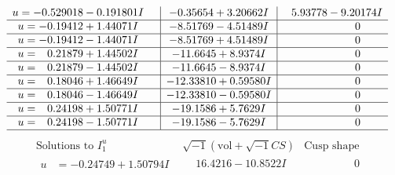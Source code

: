 \documentclass[1p]{elsarticle_modified}
\theoremstyle{definition}
\newcommand{\I}{\sqrt{-1}}
\begin{document}
$$\begin{array}{c|c|c}
\begin{aligned}
u &= -0.529018 - 0.191801 I\end{aligned}
 & -0.35654 + 3.20662 I & \phantom{-}5.93778 - 9.20174 I \\ \hline\begin{aligned}
u &= -0.19412 + 1.44071 I\end{aligned}
 & -8.51769 - 4.51489 I & \phantom{-0.000000 } 0 \\ \hline\begin{aligned}
u &= -0.19412 - 1.44071 I\end{aligned}
 & -8.51769 + 4.51489 I & \phantom{-0.000000 } 0 \\ \hline\begin{aligned}
u &= \phantom{-}0.21879 + 1.44502 I\end{aligned}
 & -11.6645 + 8.9374 I & \phantom{-0.000000 } 0 \\ \hline\begin{aligned}
u &= \phantom{-}0.21879 - 1.44502 I\end{aligned}
 & -11.6645 - 8.9374 I & \phantom{-0.000000 } 0 \\ \hline\begin{aligned}
u &= \phantom{-}0.18046 + 1.46649 I\end{aligned}
 & -12.33810 + 0.59580 I & \phantom{-0.000000 } 0 \\ \hline\begin{aligned}
u &= \phantom{-}0.18046 - 1.46649 I\end{aligned}
 & -12.33810 - 0.59580 I & \phantom{-0.000000 } 0 \\ \hline\begin{aligned}
u &= \phantom{-}0.24198 + 1.50771 I\end{aligned}
 & -19.1586 + 5.7629 I & \phantom{-0.000000 } 0 \\ \hline\begin{aligned}
u &= \phantom{-}0.24198 - 1.50771 I\end{aligned}
 & -19.1586 - 5.7629 I & \phantom{-0.000000 } 0\\
 \hline 
 \end{array}$$\newpage$$\begin{array}{c|c|c}  
\text{Solutions to }I^u_{1}& \I (\text{vol} + \sqrt{-1}CS) & \text{Cusp shape}\\
 \hline 
\begin{aligned}
u &= -0.24749 + 1.50794 I\end{aligned}
 & \phantom{-}16.4216 - 10.8522 I & \phantom{-0.000000 } 0 \\ \hline\begin{aligned}

\end{aligned}
\end{array}$$
\end{document}
